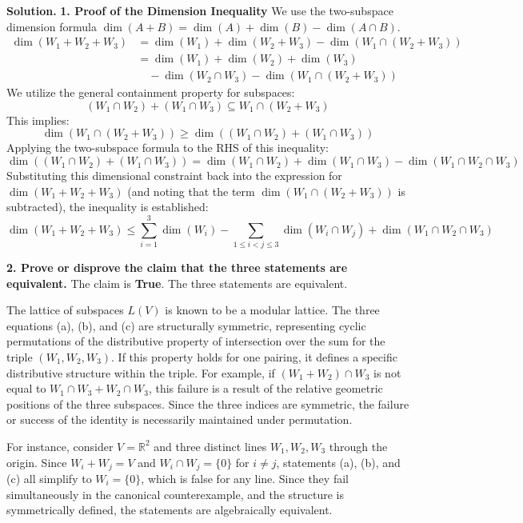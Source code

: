 \documentclass[12pt,a4paper,oneside]{article}
\newenvironment{solution}
  {\par\noindent\textbf{Solution. }\newline}
  {\par}
\begin{document}
\begin{solution}
\textbf{1. Proof of the Dimension Inequality}
We use the two-subspace dimension formula $\dim(A+B) = \dim(A) + \dim(B) - \dim(A \cap B)$.
\begin{align*}
\dim(W_1+W_2+W_3) &= \dim(W_1) + \dim(W_2+W_3) - \dim(W_1 \cap (W_2+W_3)) \\
&= \dim(W_1) + \dim(W_2) + \dim(W_3) \\
&\quad - \dim(W_2 \cap W_3) - \dim(W_1 \cap (W_2+W_3))
\end{align*}
We utilize the general containment property for subspaces:
$$(W_1 \cap W_2) + (W_1 \cap W_3) \subseteq W_1 \cap (W_2 + W_3)$$
This implies:
$$\dim(W_1 \cap (W_2 + W_3)) \ge \dim((W_1 \cap W_2) + (W_1 \cap W_3))$$
Applying the two-subspace formula to the RHS of this inequality:
$$ \dim((W_1 \cap W_2) + (W_1 \cap W_3)) = \dim(W_1 \cap W_2) + \dim(W_1 \cap W_3) - \dim(W_1 \cap W_2 \cap W_3) $$
Substituting this dimensional constraint back into the expression for $\dim(W_1+W_2+W_3)$ (and noting that the term $\dim(W_1 \cap (W_2+W_3))$ is subtracted), the inequality is established:
$$ \dim(W_{1}+W_{2}+W_{3}) \le \sum_{i=1}^{3}\dim(W_{i})-\sum_{1\le i<j\le3}\dim(W_{i}\cap W_{j})+\dim(W_{1}\cap W_{2}\cap W_{3}) $$

\textbf{2. Prove or disprove the claim that the three statements are equivalent.}
The claim is \textbf{True}. The three statements are equivalent.

The lattice of subspaces $L(V)$ is known to be a modular lattice. The three equations (a), (b), and (c) are structurally symmetric, representing cyclic permutations of the distributive property of intersection over the sum for the triple $(W_1, W_2, W_3)$.
If this property holds for one pairing, it defines a specific distributive structure within the triple. For example, if $(W_1+W_2)\cap W_3$ is not equal to $W_1\cap W_3+W_2\cap W_3$, this failure is a result of the relative geometric positions of the three subspaces. Since the three indices are symmetric, the failure or success of the identity is necessarily maintained under permutation.

For instance, consider $V=\mathbb{R}^2$ and three distinct lines $W_1, W_2, W_3$ through the origin. Since $W_i+W_j = V$ and $W_i \cap W_j = \{0\}$ for $i \ne j$, statements (a), (b), and (c) all simplify to $W_i = \{0\}$, which is false for any line. Since they fail simultaneously in the canonical counterexample, and the structure is symmetrically defined, the statements are algebraically equivalent.
\end{solution}
\end{document}
